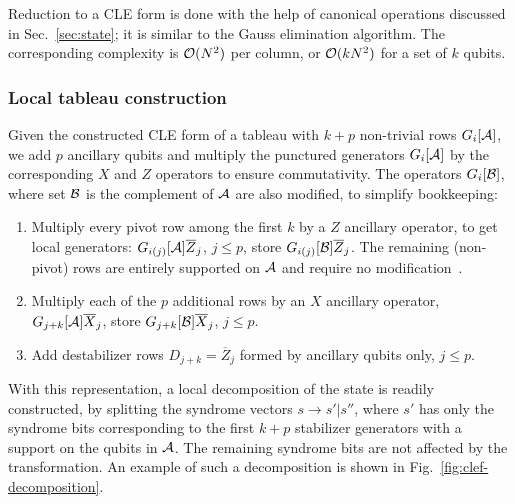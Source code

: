 Reduction to a CLE form is done with the help of canonical operations
discussed in Sec.~\ref{sec:state}; it is similar to the Gauss
elimination algorithm.  The corresponding complexity is
${\cal O}(N^2)$ per column, or ${\cal O}(kN^2)$ for a set of $k$
qubits.

\subsubsection{Local tableau construction}
\label{sec:local-tab}

Given the constructed CLE form of a tableau with $k+p$ non-trivial
rows $G_i[{\cal A}]$, we add $p$ ancillary qubits and multiply the
punctured generators $G_i[{\cal A}]$ by the corresponding $X$ and $Z$
operators to ensure commutativity.  The operators $G_i[{\cal B}]$,
where set ${\cal B}$ is the complement of ${\cal A}$ are also
modified, to simplify bookkeeping:
\begin{enumerate}
\item Multiply every pivot row among the first $k$ by a $Z$ ancillary
  operator, to get local generators:
  $G_{i(j)}[{\cal A}] \overline{Z}_j$, $j\le p$, store
  $G_{i(j)}[{\cal B}] \overline{Z}_j$.  The remaining (non-pivot) rows
  are entirely
  supported on
  ${\cal A}$ and require no modification~\cite{Fattal-Cubitt-Yamamoto-Bravyi-Chuang-2004}.
\item Multiply each of the $p$ additional rows by an $X$ ancillary
  operator, $G_{j+k}[{\cal A}] \overline{X}_j$, store
  $G_{j+k}[{\cal B}] \overline{X}_j$, $j\le p$.
\item Add destabilizer rows $D_{j+k}=\overline{Z}_j$ formed by
  ancillary qubits only, $j\le p$.
\end{enumerate}
With this representation, a local decomposition of the state is
readily constructed, by splitting the syndrome vectors $s\to s'|s''$,
where $s'$ has only the syndrome bits corresponding to the first $k+p$
stabilizer generators with a support on the qubits in ${\cal A}$.  The
remaining syndrome bits are not affected by the transformation.  An
example of such a decomposition is shown in
Fig.~\ref{fig:clef-decomposition}.


